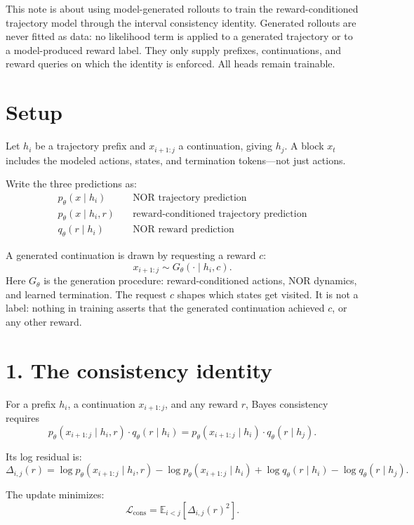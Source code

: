 \documentclass{article}
\begin{document}
This note is about using model-generated rollouts to train the reward-conditioned trajectory model
through the interval consistency identity. Generated rollouts are never fitted as data: no likelihood term
is applied to a generated trajectory or to a model-produced reward label. They only supply prefixes,
continuations, and reward queries on which the identity is enforced. All heads remain trainable.

\section*{Setup}

Let $h_i$ be a trajectory prefix and $x_{i+1:j}$ a continuation, giving $h_j$. A block $x_t$ includes the
modeled actions, states, and termination tokens---not just actions.

Write the three predictions as:
\begin{align*}
p_\theta(x \mid h_i) & \quad \text{NOR trajectory prediction} \\
p_\theta(x \mid h_i, r) & \quad \text{reward-conditioned trajectory prediction} \\
q_\theta(r \mid h_i) & \quad \text{NOR reward prediction}
\end{align*}

A generated continuation is drawn by requesting a reward $c$:
\[
x_{i+1:j} \sim G_\theta(\cdot \mid h_i, c).
\]
Here $G_\theta$ is the generation procedure: reward-conditioned actions, NOR dynamics, and learned
termination. The request $c$ shapes which states get visited. It is not a label: nothing in training
asserts that the generated continuation achieved $c$, or any other reward.

\section*{1. The consistency identity}

For a prefix $h_i$, a continuation $x_{i+1:j}$, and any reward $r$, Bayes consistency requires
\[
p_\theta(x_{i+1:j} \mid h_i, r) \cdot q_\theta(r \mid h_i) = p_\theta(x_{i+1:j} \mid h_i) \cdot q_\theta(r \mid h_j).
\]

Its log residual is:
\[
\Delta_{i,j}(r) = \log p_\theta(x_{i+1:j} \mid h_i, r) - \log p_\theta(x_{i+1:j} \mid h_i) + \log q_\theta(r \mid h_i) - \log q_\theta(r \mid h_j).
\]

The update minimizes:
\[
\mathcal{L}_{\mathrm{cons}} = \mathbb{E}_{i < j} \left[\Delta_{i,j}(r)^2\right].
\]
\end{document}
